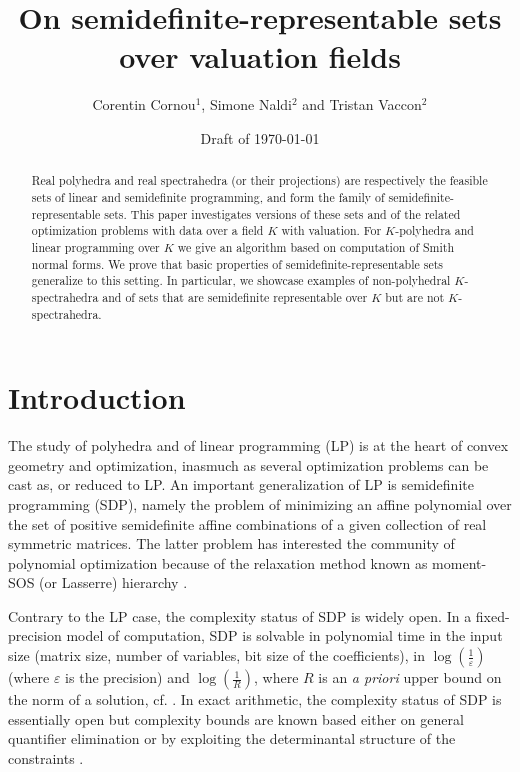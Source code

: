 \documentclass[a4paper,oneside,11pt]{article}
\title{\Large \bf On semidefinite-representable sets over valuation fields}
\begin{document}
\author{Corentin Cornou$^{1}$, Simone Naldi$^{2}$ and Tristan Vaccon$^{2}$}


\date{Draft of \today}

\maketitle

\begin{abstract}
  \noindent
  Real polyhedra and real spectrahedra (or their projections) are respectively the feasible sets
  of linear and semidefinite programming, and form the family of
  semidefinite-representable sets. This paper investigates versions of these sets and of
  the related optimization problems with data over a field $K$ with valuation.
  For $K$-polyhedra and linear programming over $K$ we give an algorithm based on computation
  of Smith normal forms.
  We prove that basic properties of semidefinite-representable sets generalize to this setting.
  In particular, we showcase examples of non-polyhedral $K$-spectrahedra and of sets that are
  semidefinite representable over $K$ but are not $K$-spectrahedra.
\end{abstract}


\section{Introduction}

The study of polyhedra and of linear programming (LP) is at the heart of convex geometry and optimization,
inasmuch as several optimization problems can be cast as, or reduced to LP. An important generalization of LP
is semidefinite programming (SDP), namely the problem of minimizing an affine polynomial over the set of
positive semidefinite affine combinations of a given collection of real symmetric matrices. The latter problem 
has interested the community of polynomial optimization because of the relaxation method known as moment-SOS
(or Lasserre) hierarchy \cite{henrion2020moment}.

Contrary to the LP case, the complexity status of SDP is widely open. In a fixed-precision model of computation, SDP is solvable in polynomial time in the input size (matrix size, number of variables, bit size of the coefficients), in $\log(\frac{1}{\varepsilon})$ (where $\varepsilon$ is the precision) and $\log(\frac{1}{R})$, where $R$ is an {\it a priori} upper bound on the norm of a solution, cf. \cite[Sec.1.9]{deKlerk}. In exact arithmetic, the complexity status of SDP is essentially open but complexity bounds are known based either on general quantifier elimination \cite{ramana1997exact,porkolab1997complexity} or by exploiting the determinantal structure of the constraints \cite{henrion2016exact}.
\end{document}

